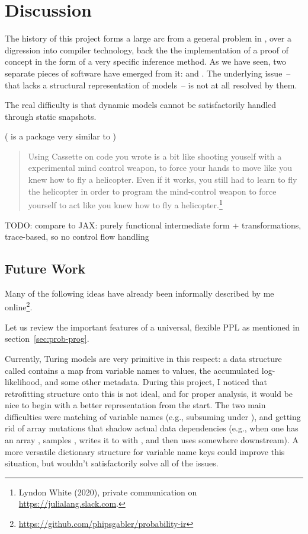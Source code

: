 \chapter{Discussion}
\label{cha:discussion}

The history of this project forms a large arc from a general problem in \turingjl{}, over a
digression into compiler technology, back the the implementation of a proof of concept in the form
of a very specific inference method.  As we have seen, two separate pieces of software have emerged
from it: \irtrackerjl{} and \autogibbsjl{}.  The underlying issue~-- that \turingjl{} lacks a
structural representation of models~-- is not at all resolved by them.

The real difficulty is that dynamic models cannot be satisfactorily handled through static
snapshots. 

( is a package very similar to )
\begin{quote}
  Using Cassette on code you wrote is a bit like shooting youself with a experimental mind control
  weapon, to force your hands to move like you knew how to fly a helicopter. Even if it works, you
  still had to learn to fly the helicopter in order to program the mind-control weapon to force
  yourself to act like you knew how to fly a helicopter.\footnote{Lyndon White (2020), private
    communication on \protect\url{https://julialang.slack.com}.}
\end{quote}


TODO: compare to JAX: purely functional intermediate form + transformations, trace-based, so no
control flow handling

\section{Future Work}
\label{sec:future-work}

Many of the following ideas have already been informally described by me
online\footnote{\protect\url{https://github.com/phipsgabler/probability-ir}}.

Let us review the important features of a universal, flexible PPL as mentioned in
section~\ref{sec:prob-prog}.

Currently, Turing models are very primitive in this respect: a data structure called 
contains a map from variable names to values, the accumulated log-likelihood, and some other
metadata. During this project, I noticed that retrofitting structure onto this is not ideal, and for
proper analysis, it would be nice to begin with a better representation from the start. The two main
difficulties were matching of variable names (e.g., subsuming  under
), and getting rid of array mutations that shadow actual data dependencies (e.g.,
when one has an array , samples , writes it to  with
, and then uses  somewhere downstream).  A more versatile
dictionary structure for variable name keys could improve this situation, but wouldn't
satisfactorily solve all of the issues.

